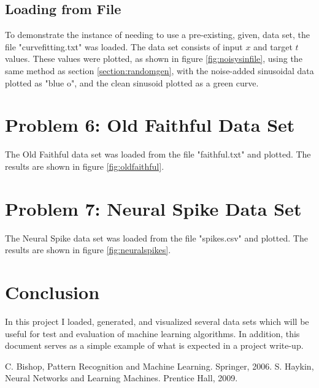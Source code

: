 \documentclass[conference]{IEEEtran}
\begin{document}
\subsection{Loading from File}
To demonstrate the instance of needing to use a pre-existing, given, data set, the file "curvefitting.txt" was loaded. The data set consists of input $x$ and target $t$ values. These values were plotted, as shown in figure \ref{fig:noisysinfile}, using the same method as section \ref{section:randomgen}, with the noise-added sinusoidal data plotted as "blue o", and the clean sinusoid plotted as a green curve.

\section{Problem 6: Old Faithful Data Set}
The Old Faithful data set was loaded from the file "faithful.txt" and plotted. The results are shown in figure \ref{fig:oldfaithful}.

\section{Problem 7: Neural Spike Data Set}
The Neural Spike data set was loaded from the file "spikes.csv" and plotted. The results are shown in figure \ref{fig:neuralspikes}.

\section{Conclusion}
In this project I loaded, generated, and visualized several data sets which will be useful for test and evaluation of machine learning algorithms. In addition, this document serves as a simple example of what is expected in a project write-up.


\begin{thebibliography}{00}
 C. Bishop, Pattern Recognition and Machine Learning. Springer, 2006.
 S. Haykin, Neural Networks and Learning Machines. Prentice Hall, 2009.
\end{thebibliography}
\end{document}
